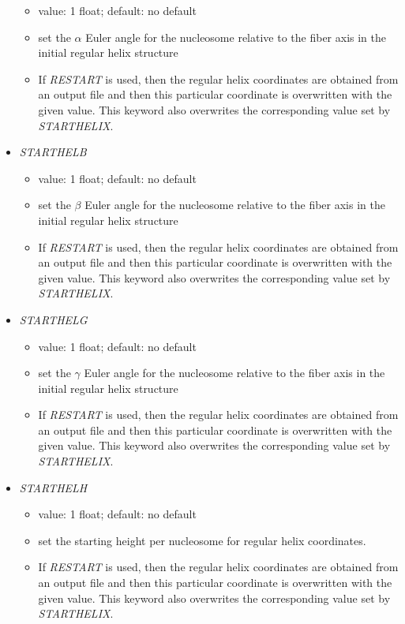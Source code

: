 \documentclass[12pt,dvips]{article}
\begin{document}
\begin{itemize}
\begin{itemize}
    \item value: 1 float; default: no default
    \item set the $\alpha$ Euler angle for the nucleosome relative to the fiber axis in the initial regular helix structure
    \item If {\it RESTART} is used, then the regular helix coordinates are obtained from an output file and then this particular coordinate is overwritten with the given value. This keyword also overwrites the corresponding value set by {\em STARTHELIX}.
  \end{itemize}
%
\item {\it STARTHELB}
  \begin{itemize}
    \item value: 1 float; default: no default
    \item set the $\beta$ Euler angle for the nucleosome relative to the fiber axis in the initial regular helix structure
    \item If {\it RESTART} is used, then the regular helix coordinates are obtained from an output file and then this particular coordinate is overwritten with the given value. This keyword also overwrites the corresponding value set by {\em STARTHELIX}.
  \end{itemize}
%
\item {\it STARTHELG}
  \begin{itemize}
    \item value: 1 float; default: no default
    \item set the $\gamma$ Euler angle for the nucleosome relative to the fiber axis in the initial regular helix structure
    \item If {\it RESTART} is used, then the regular helix coordinates are obtained from an output file and then this particular coordinate is overwritten with the given value. This keyword also overwrites the corresponding value set by {\em STARTHELIX}.
  \end{itemize}
%
\item {\it STARTHELH}
  \begin{itemize}
    \item value: 1 float; default: no default
    \item set the starting height per nucleosome for regular helix coordinates. 
    \item If {\it RESTART} is used, then the regular helix coordinates are obtained from an output file and then this particular coordinate is overwritten with the given value. This keyword also overwrites the corresponding value set by {\em STARTHELIX}.

\end{itemize}
\end{itemize}
\end{document}

